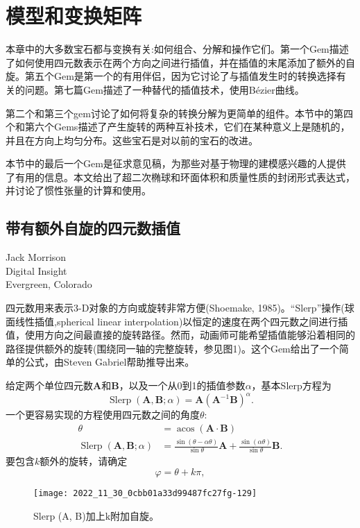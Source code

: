 \chapter{模型和变换矩阵}
本章中的大多数宝石都与变换有关:如何组合、分解和操作它们。第一个Gem描述了如何使用四元数表示在两个方向之间进行插值，并在插值的末尾添加了额外的自旋。第五个Gem是第一个的有用伴侣，因为它讨论了与插值发生时的转换选择有关的问题。第七篇Gem描述了一种替代的插值技术，使用B\'ezier曲线。

第二个和第三个gem讨论了如何将复杂的转换分解为更简单的组件。本节中的第四个和第六个Gems描述了产生旋转的两种互补技术，它们在某种意义上是随机的，并且在方向上均匀分布。这些宝石是对以前的宝石的改进。

本节中的最后一个Gem是征求意见稿，为那些对基于物理的建模感兴趣的人提供了有用的信息。本文给出了超二次椭球和环面体积和质量性质的封闭形式表达式，并讨论了惯性张量的计算和使用。

\newpage
\section{带有额外自旋的四元数插值}
\begin{center}
\small{
Jack Morrison\\
Digital Insight\\
Evergreen, Colorado}
\end{center}

四元数用来表示3-D对象的方向或旋转非常方便(Shoemake, 1985)。“Slerp”操作(球面线性插值,spherical linear interpolation)以恒定的速度在两个四元数之间进行插值，使用方向之间最直接的旋转路径。然而，动画师可能希望插值能够沿着相同的路径提供额外的旋转(围绕同一轴的完整旋转，参见图1)。这个Gem给出了一个简单的公式，由Steven Gabriel帮助推导出来。

给定两个单位四元数$\mathbf{A}$和$\mathbf{B}$，以及一个从0到1的插值参数$\alpha$，基本Slerp方程为
$$
\operatorname{Slerp}(\mathbf{A}, \mathbf{B} ; \alpha)=\mathbf{A}\left(\mathbf{A}^{-1} \mathbf{B}\right)^{\alpha} .
$$
一个更容易实现的方程使用四元数之间的角度$\theta$:
$$
\begin{aligned}
\theta &=\operatorname{acos}(\mathbf{A} \cdot \mathbf{B}) \\
\operatorname{Slerp}(\mathbf{A}, \mathbf{B} ; \alpha) &=\frac{\sin (\theta-\alpha \theta)}{\sin \theta} \mathbf{A}+\frac{\sin (\alpha \theta)}{\sin \theta} \mathbf{B} .
\end{aligned}
$$
要包含$k$额外的旋转，请确定
$$
\varphi=\theta+k \pi,
$$
\begin{figure}[htbp]
\begin{center}
\texttt{[image: 2022\_11\_30\_0cbb01a33d99487fc27fg-129]}
\end{center}
\caption{Slerp (A, B)加上$\mathrm{k}$附加自旋。}
\label{fig_3_1_1}
\end{figure}

